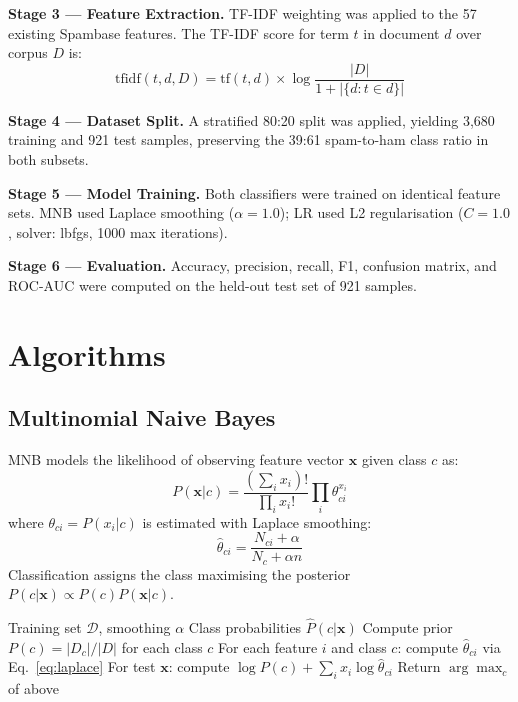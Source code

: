 \documentclass[conference,letterpaper]{IEEEtran}
\begin{document}
\textbf{Stage 3 --- Feature Extraction.}
TF-IDF weighting was applied to the 57 existing Spambase features. The TF-IDF score for
term $t$ in document $d$ over corpus $D$ is:
\begin{equation}
\mathrm{tfidf}(t,d,D) = \mathrm{tf}(t,d) \times \log\frac{|D|}{1+|\{d:t\in d\}|}
\label{eq:tfidf}
\end{equation}

\textbf{Stage 4 --- Dataset Split.}
A stratified 80:20 split was applied, yielding 3,680 training and 921 test samples, preserving
the 39:61 spam-to-ham class ratio in both subsets.

\textbf{Stage 5 --- Model Training.}
Both classifiers were trained on identical feature sets. MNB used Laplace smoothing
($\alpha{=}1.0$); LR used L2 regularisation ($C{=}1.0$, solver: lbfgs, 1000 max iterations).

\textbf{Stage 6 --- Evaluation.}
Accuracy, precision, recall, F1, confusion matrix, and ROC-AUC were computed on the held-out
test set of 921 samples.

\section{Algorithms}
\label{sec:algo}

\subsection{Multinomial Naive Bayes}

MNB models the likelihood of observing feature vector $\mathbf{x}$ given class $c$ as:
\begin{equation}
P(\mathbf{x}|c) = \frac{(\sum_i x_i)!}{\prod_i x_i!}\prod_i \theta_{ci}^{x_i}
\label{eq:mnb}
\end{equation}
where $\theta_{ci} = P(x_i|c)$ is estimated with Laplace smoothing:
\begin{equation}
\hat{\theta}_{ci} = \frac{N_{ci} + \alpha}{N_c + \alpha n}
\label{eq:laplace}
\end{equation}
Classification assigns the class maximising the posterior $P(c|\mathbf{x}) \propto P(c)P(\mathbf{x}|c)$.

\begin{algorithm}[!t]
\caption{Multinomial Naive Bayes}
\label{alg:nb}
\begin{algorithmic}[1]
\REQUIRE Training set $\mathcal{D}$, smoothing $\alpha$
\ENSURE Class probabilities $\hat{P}(c|\mathbf{x})$
\STATE Compute prior $P(c) = |D_c|/|D|$ for each class $c$
\STATE For each feature $i$ and class $c$: compute $\hat{\theta}_{ci}$ via Eq.~\ref{eq:laplace}
\STATE For test $\mathbf{x}$: compute $\log P(c) + \sum_i x_i \log\hat{\theta}_{ci}$
\STATE Return $\arg\max_c$ of above
\end{algorithmic}
\end{algorithm}
\end{document}
